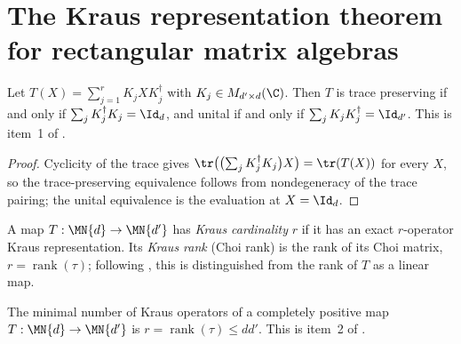 \section{The Kraus representation theorem for rectangular matrix algebras}

\begin{theorem}
    \label{thm:kraus_rect_normalization}
    \leanok
    Let $T(X)=\sum_{j=1}^{r}K_jXK_j^\dagger$ with
    $K_j\in M_{d'\times d}(\C)$. Then $T$ is trace preserving if and only
    if $\sum_j K_j^\dagger K_j=\Id_d$, and unital if and only if
    $\sum_j K_jK_j^\dagger=\Id_{d'}$. This is item~1 of
    \cite[Theorem~2.1]{Wolf2012Quantum}.
\end{theorem}

\begin{proof}
    \leanok
    Cyclicity of the trace gives
    $\tr\bigl(\bigl(\sum_j K_j^\dagger K_j\bigr)X\bigr)=\tr(T(X))$ for every
    $X$, so the trace-preserving equivalence follows from nondegeneracy of
    the trace pairing; the unital equivalence is the evaluation at $X=\Id_d$.
\end{proof}

\begin{definition}
    \label{def:kraus_rank_rect}
    \leanok
    A map $T:\MN{d}\to\MN{d'}$ has \emph{Kraus cardinality} $r$ if it has an
    exact $r$-operator Kraus representation. Its \emph{Kraus rank} (Choi
    rank) is the rank of its Choi matrix, $r=\operatorname{rank}(\tau)$;
    following \cite[Theorem~2.1, footnote]{Wolf2012Quantum}, this is
    distinguished from the rank of $T$ as a linear map.
\end{definition}

\begin{theorem}
    \label{thm:kraus_rect_rank_minimal}
    \leanok
    The minimal number of Kraus operators of a completely positive map
    $T:\MN{d}\to\MN{d'}$ is $r=\operatorname{rank}(\tau)\leq dd'$. This is
    item~2 of \cite[Theorem~2.1]{Wolf2012Quantum}.
\end{theorem}


